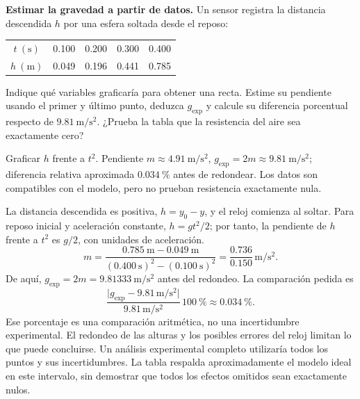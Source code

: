 \begin{ejercicio}
\textbf{Estimar la gravedad a partir de datos.} Un sensor registra la distancia descendida \(h\) por una esfera soltada desde el reposo:
\begin{center}
\begin{tabular}{c c c c c}
\toprule
\(t\ (\si{\second})\)&0.100&0.200&0.300&0.400\\
\(h\ (\si{\meter})\)&0.049&0.196&0.441&0.785\\
\bottomrule
\end{tabular}
\end{center}
Indique qué variables graficaría para obtener una recta. Estime su pendiente usando el primer y último punto, deduzca \(g_{\text{exp}}\) y calcule su diferencia porcentual respecto de \(\SI{9.81}{\meter\per\second\squared}\). ¿Prueba la tabla que la resistencia del aire sea exactamente cero?
\end{ejercicio}
\begin{respuesta}
Graficar \(h\) frente a \(t^2\). Pendiente \(m\approx\SI{4.91}{\meter\per\second\squared}\), \(g_{\text{exp}}=2m\approx\SI{9.81}{\meter\per\second\squared}\); diferencia relativa aproximada \(\SI{0.034}{\percent}\) antes de redondear. Los datos son compatibles con el modelo, pero no prueban resistencia exactamente nula.
\end{respuesta}
\begin{explicacion}
La distancia descendida es positiva, \(h=y_0-y\), y el reloj comienza al soltar. Para reposo inicial y aceleración constante, \(h=gt^2/2\); por tanto, la pendiente de \(h\) frente a \(t^2\) es \(g/2\), con unidades de aceleración.
\[ m=\frac{\SI{0.785}{\meter}-\SI{0.049}{\meter}}{(\SI{0.400}{\second})^2-(\SI{0.100}{\second})^2}=\frac{0.736}{0.150}\,\si{\meter\per\second\squared}. \]
De aquí, \(g_{\text{exp}}=2m=\SI{9.81333}{\meter\per\second\squared}\) antes del redondeo. La comparación pedida es
\[ \frac{\lvert g_{\text{exp}}-9.81\,\si{\meter\per\second\squared}\rvert}{9.81\,\si{\meter\per\second\squared}}\,\SI{100}{\percent}\approx\SI{0.034}{\percent}. \]
Ese porcentaje es una comparación aritmética, no una incertidumbre experimental. El redondeo de las alturas y los posibles errores del reloj limitan lo que puede concluirse. Un análisis experimental completo utilizaría todos los puntos y sus incertidumbres. La tabla respalda aproximadamente el modelo ideal en este intervalo, sin demostrar que todos los efectos omitidos sean exactamente nulos.
\end{explicacion}

